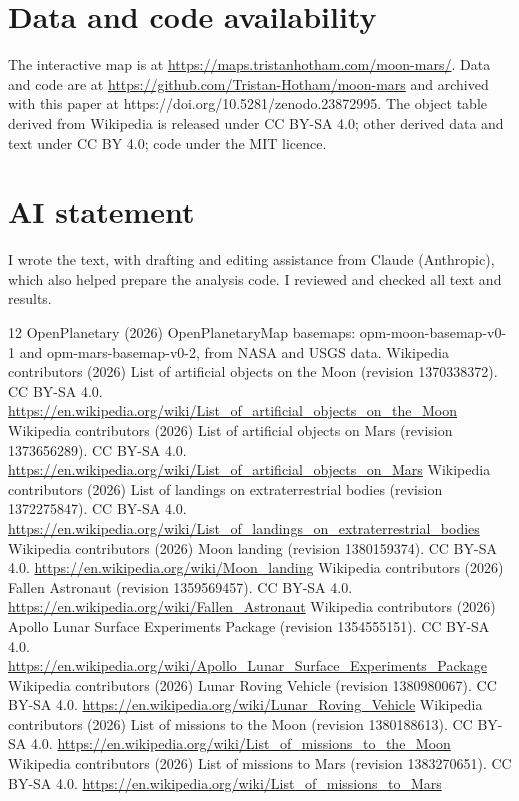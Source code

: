 \documentclass[11pt,a4paper]{article}
\begin{document}
\section*{Data and code availability}
The interactive map is at \url{https://maps.tristanhotham.com/moon-mars/}. Data and code are at \url{https://github.com/Tristan-Hotham/moon-mars} and archived with this paper at https://doi.org/10.5281/zenodo.23872995. The object table derived from Wikipedia is released under CC BY-SA 4.0; other derived data and text under CC BY 4.0; code under the MIT licence.

\section*{AI statement}
I wrote the text, with drafting and editing assistance from Claude (Anthropic), which also helped prepare the analysis code. I reviewed and checked all text and results.

\begin{thebibliography}{12}
 OpenPlanetary (2026) OpenPlanetaryMap basemaps: opm-moon-basemap-v0-1 and opm-mars-basemap-v0-2, from NASA and USGS data.
 Wikipedia contributors (2026) List of artificial objects on the Moon (revision 1370338372). CC BY-SA 4.0. \url{https://en.wikipedia.org/wiki/List_of_artificial_objects_on_the_Moon}
 Wikipedia contributors (2026) List of artificial objects on Mars (revision 1373656289). CC BY-SA 4.0. \url{https://en.wikipedia.org/wiki/List_of_artificial_objects_on_Mars}
 Wikipedia contributors (2026) List of landings on extraterrestrial bodies (revision 1372275847). CC BY-SA 4.0. \url{https://en.wikipedia.org/wiki/List_of_landings_on_extraterrestrial_bodies}
 Wikipedia contributors (2026) Moon landing (revision 1380159374). CC BY-SA 4.0. \url{https://en.wikipedia.org/wiki/Moon_landing}
 Wikipedia contributors (2026) Fallen Astronaut (revision 1359569457). CC BY-SA 4.0. \url{https://en.wikipedia.org/wiki/Fallen_Astronaut}
 Wikipedia contributors (2026) Apollo Lunar Surface Experiments Package (revision 1354555151). CC BY-SA 4.0. \url{https://en.wikipedia.org/wiki/Apollo_Lunar_Surface_Experiments_Package}
 Wikipedia contributors (2026) Lunar Roving Vehicle (revision 1380980067). CC BY-SA 4.0. \url{https://en.wikipedia.org/wiki/Lunar_Roving_Vehicle}
 Wikipedia contributors (2026) List of missions to the Moon (revision 1380188613). CC BY-SA 4.0. \url{https://en.wikipedia.org/wiki/List_of_missions_to_the_Moon}
 Wikipedia contributors (2026) List of missions to Mars (revision 1383270651). CC BY-SA 4.0. \url{https://en.wikipedia.org/wiki/List_of_missions_to_Mars}
\end{thebibliography}
\end{document}
